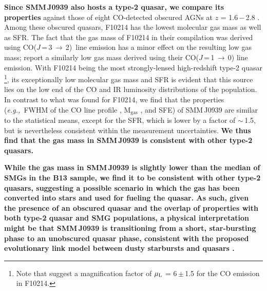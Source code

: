 \documentclass[iop, revtex4]{emulateapj}
\newcommand{\rarr}{$\rightarrow$}
\newcommand{\CO}{\mbox{CO($J$\,=\,3\,$\rightarrow$\,2) }}
\newcommand{\eg}{{\sl e.g.,~}}
\begin{document}
{\bf Since SMM\,J0939 also hosts a type-2 quasar, we compare its properties}
against those of eight CO-detected obscured AGNs at $z$ = 1.6\,$-$\,2.8 \citep[][and references
therein]{Polletta11a}. 
Among these obscured quasars, F10214 has the lowest molecular gas mass as well as SFR. The fact that the gas mass of F10214 in their compilation was derived using \CO line emission \citep{Solomon05a} has a minor effect on the resulting low gas mass; \citet{Riechers11a} report
a similarly low gas mass derived using their CO($J$\,=\,1\,\rarr\,0) line emission.
With F10214 being the most strongly-lensed high-redshift type-2 quasar \citep[$\mu_{\textrm L}$ = 17; ][]{Solomon05a}\footnote{Note that \citet{Deane13a} suggest a magnification factor of $\mu_{\textrm L}$ = 6\,$\pm$\,1.5 for the CO emission in F10214.}, its exceptionally low molecular gas mass and SFR is evident that this source lies on the low end of the CO and IR luminosity distributions of the population.
In contrast to what was found for F10214, we find that the properties
(\eg FWHM of the CO line profile 
, M$_\textrm{gas}$
, and SFE) of SMM\,J0939 are similar to the statistical means, except for the SFR, which is lower by a
factor of $\sim$\,1.5, but is nevertheless consistent within the measurement uncertainties. {\bf We thus find that the gas mass in SMM\,J0939 is consistent with other type-2 quasars. }


{\bf 
While the gas mass in SMM\,J0939 is slightly lower than the median of SMGs in the B13 sample, we find it to be consistent with other type-2 quasars, suggesting a possible scenario in which the gas has been converted into stars and used for fueling the quasar.
As such, given the presence of an obscured quasar and the overlap of properties 
with both type-2 quasar and SMG populations,
a physical interpretation might be that SMM\,J0939 is transitioning from a short, star-bursting phase to an unobscured quasar phase, consistent with the proposed evolutionary link model between dusty starbursts and quasars \citep[\eg][]{Sanders88,Coppin08a,Simpson12a}. 
}

\end{document}
